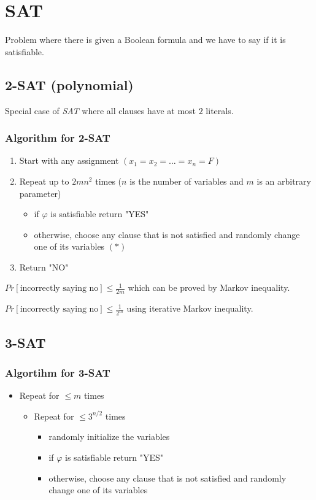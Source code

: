 \section{SAT}

Problem where there is given a Boolean formula and we have to say if it is satisfiable.

\subsection{2-SAT (polynomial)}

Special case of \textit{SAT} where all clauses have at most $2$ literals.

\subsubsection{Algorithm for 2-SAT}

\begin{enumerate}
	\item Start with any assignment $(x_{1} = x_{2} = \dots = x_{n} = F)$
	\item Repeat up to $2mn^{2}$ times ($n$ is the number of variables and $m$ is an arbitrary parameter)
	\begin{itemize}
		\item if $\varphi$ is satisfiable return "YES"
		\item otherwise, choose any clause that is not satisfied and randomly change one of its variables $(\ast)$
	\end{itemize}
	\item Return "NO"
\end{enumerate}

$Pr[\text{incorrectly saying no}]  \leq \frac{1}{2m}$ which can be proved by Markov inequality.

$Pr[\text{incorrectly saying no}]  \leq \frac{1}{2^m}$ using iterative Markov inequality.

\subsection{3-SAT}

\subsubsection{Algortihm for 3-SAT}

\begin{itemize}
	\item Repeat for $\leq m$ times
	\begin{itemize}
		\item Repeat for $\leq 3^{n/2}$ times
		\begin{itemize}
			\item randomly initialize the variables
			\item if $\varphi$ is satisfiable return "YES"
			\item otherwise, choose any clause that is not satisfied and randomly change one of its variables
		\end{itemize}
	\end{itemize}
\end{itemize}

